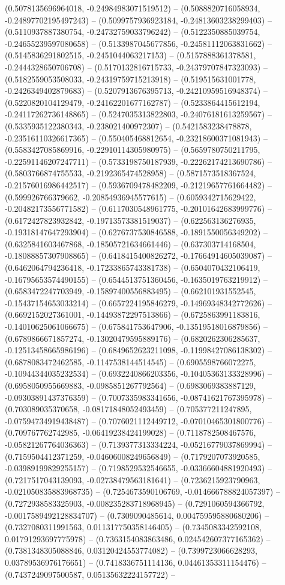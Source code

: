 (0.5078135696964018, -0.24984983071519512) -- (0.5088820716058934, -0.24897702195497243) -- (0.5099757936923184, -0.24813603238299403) -- (0.5110937887380754, -0.24732759033796242) -- (0.5122350885039754, -0.24655239597080658) -- (0.5133987045677856, -0.24581112063831662) -- (0.5145836291802515, -0.2451044063217153) -- (0.5157888361378581, -0.2444328650706708) -- (0.5170132816715733, -0.24379707847323093) -- (0.5182559053508033, -0.24319759715213918) -- (0.519515631001778, -0.2426349402879683) -- (0.5207913676395713, -0.24210959516948374) -- (0.5220820104129479, -0.24162201677162787) -- (0.5233864415612194, -0.24117262736148865) -- (0.5247035313822803, -0.24076181613259567) -- (0.5335935122380343, -0.238021400972307) -- (0.5421583238478878, -0.23516110326617365) -- (0.550405468812654, -0.23218600371081943) -- (0.5583427085869916, -0.22910114305980975) -- (0.5659780750211795, -0.22591146207247711) -- (0.5733198750187939, -0.22262174213690786) -- (0.5803766874755533, -0.2192365474528958) -- (0.5871573518367524, -0.21576016986442517) -- (0.5936709478482209, -0.21219657761664482) -- (0.599926766379662, -0.20854936945577615) -- (0.6059342715629422, -0.20482173556771582) -- (0.6117030548961775, -0.20101642683999776) -- (0.6172427823932842, -0.19713573381519037) -- (0.622563136276935, -0.19318147647293904) -- (0.6276737530846588, -0.1891550056349202) -- (0.6325841603467868, -0.18505721634661446) -- (0.637303714168504, -0.18088857307908865) -- (0.6418415400826272, -0.17664914605039087) -- (0.6462064794236418, -0.17233865743381738) -- (0.6504070432106419, -0.16795653574490155) -- (0.6544513751360456, -0.1635019763219912) -- (0.6583472247703949, -0.15897400556883495) -- (0.662101931552545, -0.15437154653033214) -- (0.6657224195846279, -0.14969348342772626) -- (0.6692152027361001, -0.14493872297513866) -- (0.6725863991183816, -0.14010625061066675) -- (0.675841753647906, -0.13519518016879856) -- (0.6789866671857274, -0.13020479595889176) -- (0.6820262306285637, -0.12513458665986196) -- (0.6849652623211098, -0.11998427086138302) -- (0.6878083472462585, -0.1147538144514545) -- (0.6905598766072275, -0.10944344035232534) -- (0.6932240866203356, -0.10405363133328996) -- (0.6958050955669883, -0.0985851267792564) -- (0.6983069383887129, -0.09303891437376359) -- (0.7007335983341656, -0.08741621767395978) -- (0.703089035370658, -0.08171848052493459) -- (0.705377211247895, -0.07594734919438487) -- (0.7076021112449712, -0.07010465301800776) -- (0.709767762742985, -0.06419238424199028) -- (0.7118782508467576, -0.05821267764036363) -- (0.7139377313334224, -0.05216779037869994) -- (0.7159504412371259, -0.04606008249656849) -- (0.7179207073920585, -0.03989199829255157) -- (0.7198529532546655, -0.03366604881920493) -- (0.7217517043139093, -0.02738479563181641) -- (0.7236215923790963, -0.021050835883968735) -- (0.7254673590106769, -0.014666788824057397) -- (0.7272938583325903, -0.008235283718968945) -- (0.7291060594366792, -0.0017589492128834707) -- (0.7309090485614, 0.004759595880680206) -- (0.7327080311991563, 0.011317750358146405) -- (0.7345083342592108, 0.01791293697775978) -- (0.7363154083863486, 0.024542607377165362) -- (0.7381348305088846, 0.03120424553774082) -- (0.7399723066628293, 0.03789536976176651) -- (0.7418336751114136, 0.04461353311154476) -- (0.7437249097500587, 0.05135632224157722) -- 
